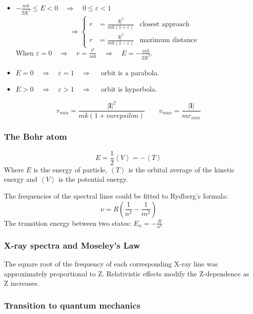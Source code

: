 \documentclass[a4paper,lang=cn,a4paper]{elegantpaper}
\newcommand{\vect}[1]{\boldsymbol{#1}}
\begin{document}
\begin{itemize}
    \item $-\frac{mk}{2|\vect{l}|^2}\leqslant E <0 \quad \Longrightarrow \quad 0\leqslant\varepsilon<1$
    \begin{equation*}
        \Longrightarrow \left\{
        \begin{aligned}
            r &= \frac{|\vect{l}|^2}{mk(1+\varepsilon)} &\text{closest approach}\\
            r &= \frac{|\vect{l}|^2}{mk(1-\varepsilon)} &\text{maximum distance}
        \end{aligned}\right.
    \end{equation*}
    When $\varepsilon = 0 \quad \Longrightarrow \quad r=\frac{l^2}{mk}\quad \Longrightarrow \quad E=-\frac{mk}{2|\vect{l}|^2}$.
    \item $E=0\quad \Longrightarrow \quad \varepsilon=1 \quad \Longrightarrow \quad$ orbit is a parabola.
    \item $E>0\quad \Longrightarrow \quad \varepsilon>1 \quad \Longrightarrow \quad$ orbit is hyperbola.
\end{itemize}
\begin{equation*}
    r_{min}=\frac{|\vect{l}|^2}{mk(1+varepsilon)} \qquad v_{max}=\frac{|\vect{l}|}{mr_{min}}
\end{equation*}

\subsubsection{The Bohr atom}
\begin{equation*}
    E = \frac{1}{2} \left\langle V\right\rangle = -\left\langle T\right\rangle
\end{equation*}
Where $E$ is the energy of particle, $\left\langle T \right\rangle$
is the orbital average of the kinetic energy and 
$\left\langle V\right\rangle$ is the potential energy.

The frequencies of the spectral lines could be fitted to Rydberg's 
formula: 
\begin{equation*}
    \nu = R\left(\frac{1}{n^2}-\frac{1}{m^2}\right)
\end{equation*}
The transition energy between two states: $E_n = -\frac{R}{n^2}$

\subsubsection{X-ray spectra and Moseley's Law}
The square root of the frequency of each corresponding X-ray line 
was approximately proportional to Z. Relativistic effects modify the 
Z-dependence as Z increases.

\subsubsection{Transition to quantum mechanics}
\end{document}
